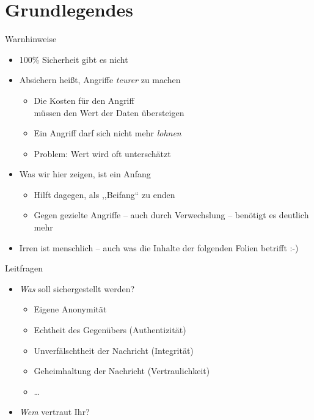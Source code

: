 \section{Grundlegendes}
\begin{frame}{Warnhinweise}
  \begin{itemize}
    \item 100\% Sicherheit gibt es nicht
    \item Absichern heißt, Angriffe \emph{teurer} zu machen
    \begin{itemize}
    \item Die Kosten für den Angriff\\ müssen den Wert der Daten übersteigen
    \item Ein Angriff darf sich nicht mehr \emph{lohnen}
    \item Problem: Wert wird oft unterschätzt
    \end{itemize}
    \item Was wir hier zeigen, ist ein Anfang
    \begin{itemize}
      \item Hilft dagegen, als ,,Beifang`` zu enden
      \item Gegen gezielte Angriffe -- auch durch Verwechslung -- benötigt es deutlich mehr
    \end{itemize}
    \item Irren ist menschlich -- auch was die Inhalte der folgenden Folien betrifft :-)
  \end{itemize}
\end{frame}

\begin{frame}{Leitfragen}
  \begin{itemize}
    \item \emph{Was} soll sichergestellt werden?
      \begin{itemize}
        \item Eigene Anonymität
        \item Echtheit des Gegenübers (Authentizität)
        \item Unverfälschtheit der Nachricht (Integrität)
        \item Geheimhaltung der Nachricht (Vertraulichkeit)
        \item \ldots
      \end{itemize}
    \item \emph{Wem} vertraut Ihr?
  \end{itemize}
\end{frame}

